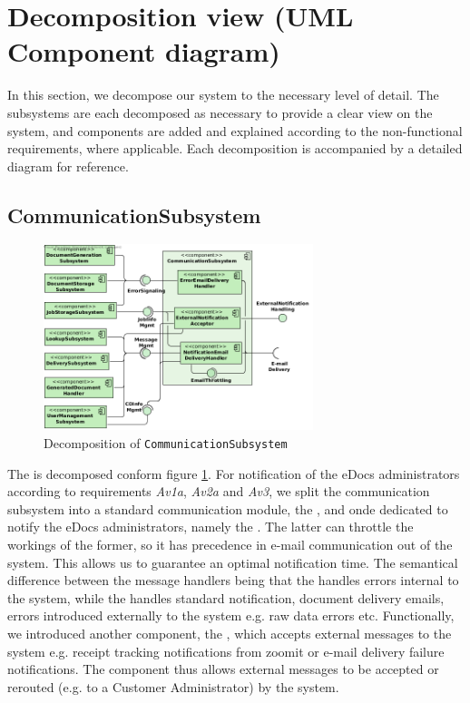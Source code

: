\section{Decomposition view (UML Component diagram)}\label{sec:decomposition}
In this section, we decompose our system to the necessary level of detail. The subsystems are each decomposed as necessary to provide a clear view on the system, and components are added and explained according to the non-functional requirements, where applicable. Each decomposition is accompanied by a detailed diagram for reference.

\subsection{CommunicationSubsystem}
\begin{figure}[!htp]
    \centering
    \includegraphics[width=0.7\textwidth]{figures/Communication Subsystem.png}
    \caption{Decomposition of \texttt{CommunicationSubsystem}}\label{fig:decomp-commsub}
\end{figure}

The  is decomposed conform figure \ref{fig:decomp-commsub}. For notification of the eDocs administrators according to requirements \emph{Av1a}, \emph{Av2a} and \emph{Av3}, we split the communication subsystem into a standard communication module, the , and onde dedicated to notify the eDocs administrators, namely the . The latter can throttle the workings of the former, so it has precedence in e-mail communication out of the system. This allows us to guarantee an optimal notification time. The semantical difference between the message handlers being that the  handles errors internal to the system, while the  handles standard notification, document delivery emails, errors introduced externally to the system e.g. raw data errors etc. Functionally, we introduced another component, the , which accepts external messages to the system e.g. receipt tracking notifications from zoomit or e-mail delivery failure notifications. The component thus allows external messages to be accepted or rerouted (e.g. to a Customer Administrator) by the system.

